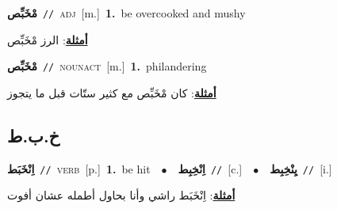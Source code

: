 \documentclass[10pt,a4paper,twoside]{article} %
\begin{document}
\begin{multicols}{2}
{\setlength\topsep{0pt}\textbf{\foreignlanguage{arabic}{مْخَبِّص}}\ {\color{gray}\texttt{//}\color{black}}\ \textsc{adj}\ [m.]\ \textbf{1.}~be overcooked and mushy\  \begin{flushright}\color{gray}\foreignlanguage{arabic}{\textbf{\underline{\foreignlanguage{arabic}{أمثلة}}}: الرز مْخَبِّص}\end{flushright}\color{black}} \vspace{2mm}

{\setlength\topsep{0pt}\textbf{\foreignlanguage{arabic}{مْخَبِّص}}\ {\color{gray}\texttt{//}\color{black}}\ \textsc{noun\textunderscore act}\ [m.]\ \textbf{1.}~philandering\  \begin{flushright}\color{gray}\foreignlanguage{arabic}{\textbf{\underline{\foreignlanguage{arabic}{أمثلة}}}: كان مْخَبِّص مع كثير ستّات قبل ما يتجوز}\end{flushright}\color{black}} \vspace{2mm}

\vspace{-3mm}
\subsection*{\color{blue}\foreignlanguage{arabic}{خ.ب.ط}\color{blue}{}} 

{\setlength\topsep{0pt}\textbf{\foreignlanguage{arabic}{اِنْخَبَط}}\ {\color{gray}\texttt{//}\color{black}}\ \textsc{verb}\ [p.]\ \textbf{1.}~be hit\ \ $\bullet$\ \ \setlength\topsep{0pt}\textbf{\foreignlanguage{arabic}{اِنْخِبِط}}\ {\color{gray}\texttt{//}\color{black}}\ [c.]\ \ $\bullet$\ \ \setlength\topsep{0pt}\textbf{\foreignlanguage{arabic}{يِنْخِبِط}}\ {\color{gray}\texttt{//}\color{black}}\ [i.]\  \begin{flushright}\color{gray}\foreignlanguage{arabic}{\textbf{\underline{\foreignlanguage{arabic}{أمثلة}}}: اِنْخَبَط راشي وأنا بحاول أطمله عشان أفوت}\end{flushright}\color{black}} \vspace{2mm}


\end{multicols}
\end{document}
